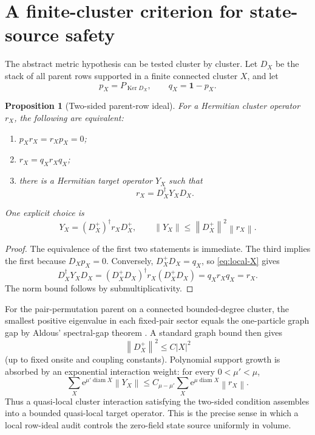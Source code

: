 \documentclass[11pt]{article}
\newtheorem{proposition}[theorem]{Proposition}
\theoremstyle{definition}
\theoremstyle{remark}
\newcommand{\Id}{\mathbf 1}
\newcommand{\Ker}{\operatorname{Ker}}
\newcommand{\e}{\mathrm e}
\newcommand{\norm}[1]{\left\lVert #1\right\rVert}
\newcommand{\abs}[1]{\left\lvert #1\right\rvert}
\begin{document}
\section{A finite-cluster criterion for state-source safety}
\label{sec:row-ideal}

The abstract metric hypothesis can be tested cluster by cluster.  Let $D_X$ be
the stack of all parent rows supported in a finite connected cluster $X$, and
let
\begin{equation}
 p_X=P_{\Ker D_X},
 \qquad q_X=\Id-p_X.
 \label{eq:local-pq}
\end{equation}

\begin{proposition}[Two-sided parent-row ideal]
\label{prop:row-ideal}
For a Hermitian cluster operator $r_X$, the following are equivalent:
\begin{enumerate}
\item $p_Xr_X=r_Xp_X=0$;
\item $r_X=q_Xr_Xq_X$;
\item there is a Hermitian target operator $Y_X$ such that
\begin{equation}
 r_X=D_X^\dagger Y_XD_X.
 \label{eq:local-factorization}
\end{equation}
\end{enumerate}
One explicit choice is
\begin{equation}
 Y_X=(D_X^+)^\dagger r_XD_X^+,
 \qquad
 \norm{Y_X}\le\norm{D_X^+}^2\norm{r_X}.
 \label{eq:local-X}
\end{equation}
\end{proposition}

\begin{proof}
The equivalence of the first two statements is immediate.  The third implies
the first because $D_Xp_X=0$.  Conversely,
$D_X^+D_X=q_X$, so \eqref{eq:local-X} gives
\begin{equation}
 D_X^\dagger Y_XD_X
 =(D_X^+D_X)^\dagger r_X(D_X^+D_X)
 =q_Xr_Xq_X=r_X.
\end{equation}
The norm bound follows by submultiplicativity.
\end{proof}

For the pair-permutation parent on a connected bounded-degree cluster, the
smallest positive eigenvalue in each fixed-pair sector equals the one-particle
graph gap by Aldous' spectral-gap theorem \cite{Caputo2010}.  A standard graph
bound then gives
\begin{equation}
 \norm{D_X^+}^2\le C\abs X^2
 \label{eq:local-pseudoinverse}
\end{equation}
(up to fixed onsite and coupling constants).  Polynomial support growth is
absorbed by an exponential interaction weight: for every $0<\mu'<\mu$,
\begin{equation}
 \sum_X\e^{\mu'\operatorname{diam}X}\norm{Y_X}
 \le C_{\mu-\mu'}
 \sum_X\e^{\mu\operatorname{diam}X}\norm{r_X}.
 \label{eq:locality-loss}
\end{equation}
Thus a quasi-local cluster interaction satisfying the two-sided condition
assembles into a bounded quasi-local target operator.  This is the precise
sense in which a local row-ideal audit controls the zero-field state source
uniformly in volume.
\end{document}
